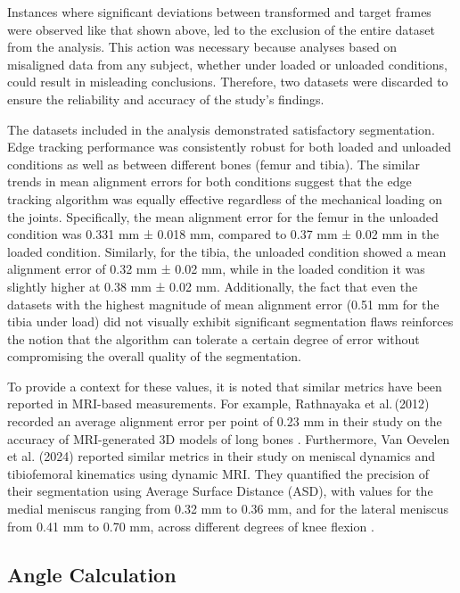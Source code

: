 \documentclass{micro-econ-thesis}
\begin{document}
Instances where significant deviations between transformed and target frames were observed like that shown above, led to the exclusion of the entire dataset from the analysis. This action was necessary because analyses based on misaligned data from any subject, whether under loaded or unloaded conditions, could result in misleading conclusions. Therefore, two datasets were discarded to ensure the reliability and accuracy of the study's findings.

The datasets included in the analysis  demonstrated satisfactory segmentation. Edge tracking performance was consistently robust for both loaded and unloaded conditions as well as between different bones (femur and tibia). The similar trends in mean alignment errors for both conditions suggest that the edge tracking algorithm was equally effective regardless of the mechanical loading on the joints. Specifically, the mean alignment error for the femur in the unloaded condition was 0.331 mm ± 0.018 mm, compared to 0.37 mm ± 0.02 mm in the loaded condition. Similarly, for the tibia, the unloaded condition showed a mean alignment error of 0.32 mm ± 0.02 mm, while in the loaded condition it was slightly higher at 0.38 mm ± 0.02 mm. Additionally, the fact that even the datasets with the highest magnitude of mean alignment error (0.51 mm for the tibia under load) did not visually exhibit significant segmentation flaws reinforces the notion that the algorithm can tolerate a certain degree of error without compromising the overall quality of the segmentation.

To provide a context for these values, it is noted that similar metrics have been reported in MRI-based measurements. For example, Rathnayaka et al.\,(2012) recorded an average alignment error per point of 0.23 mm in their study on the accuracy of MRI-generated 3D models of long bones \parencite{rathnayaka_quantification_2012}.  Furthermore, Van Oevelen et al. (2024) reported similar metrics in their study on meniscal dynamics and tibiofemoral kinematics using dynamic MRI. They quantified the precision of their segmentation using Average Surface Distance (ASD), with values for the medial meniscus ranging from 0.32 mm to 0.36 mm, and for the lateral meniscus from 0.41 mm to 0.70 mm, across different degrees of knee flexion \parencite{van_oevelen_relation_2024}.


\subsection{Angle Calculation}
\end{document}
